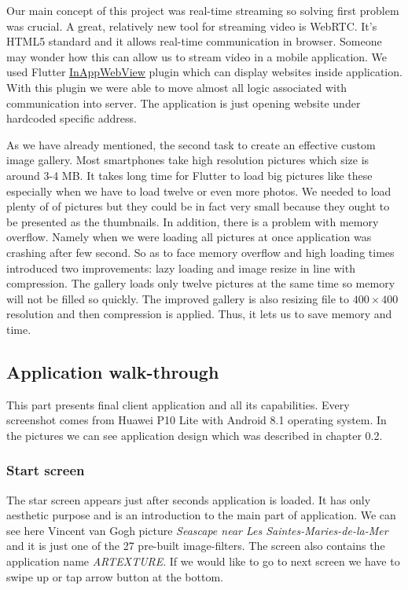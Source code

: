 \documentclass[../Main.tex]{subfiles}
\begin{document}
Our main concept of this project was real-time streaming so solving first problem was crucial.
A great, relatively new tool for streaming video is WebRTC.
It's HTML5 standard and it allows real-time communication in browser. 
Someone may wonder how this can allow us to stream video in a mobile application.
We used Flutter \href{https://pub.dev/packages/flutter_inappwebview}{InAppWebView} plugin which can display websites inside application.
With this plugin we were able to move almost all logic associated with communication into server.
The application is just opening website under hardcoded specific address.

As we have already mentioned, the second task to create an effective custom image gallery. 
Most smartphones take high resolution pictures which size is around 3-4 MB.
It takes long time for Flutter to load big pictures like these especially when
we have to load twelve or even more photos. We needed to load plenty of of pictures but they could be in fact very small because they ought to be presented as the thumbnails.
In addition, there is a problem with 
memory overflow. Namely when we were loading all pictures at once application was
crashing after few second. 
So as to face memory overflow and high loading times introduced two improvements:
lazy loading and image resize in line with compression.
The gallery loads only twelve pictures at the same time so memory will not be filled so quickly.
The improved gallery is also resizing file to $400\times400$ resolution and then compression is applied.
Thus, it lets us to save memory and time.


\subsection{Application walk-through}
This part presents final client application and all its capabilities.
Every screenshot comes from Huawei P10 Lite with Android 8.1 operating system. In the pictures we can see application design which was described in chapter 0.2.

\subsubsection{Start screen}
The star screen appears just after seconds application is loaded. It has only aesthetic purpose and is an introduction to the main part of application. We can see here Vincent van Gogh picture \textit{Seascape near Les Saintes-Maries-de-la-Mer} and it is just one of the 27 pre-built image-filters. The screen also contains the application name \textit{ARTEXTURE}. If we would like to go to next screen we have to swipe up or tap arrow button at the bottom.
\end{document}
